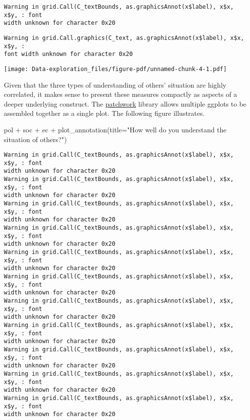 \documentclass[
  letterpaper,
  DIV=11,
  numbers=noendperiod]{scrreprt}
\newenvironment{Shaded}{\begin{snugshade}}{\end{snugshade}}
\newcommand{\AttributeTok}[1]{\textcolor[rgb]{0.40,0.45,0.13}{#1}}
\newcommand{\FunctionTok}[1]{\textcolor[rgb]{0.28,0.35,0.67}{#1}}
\newcommand{\NormalTok}[1]{\textcolor[rgb]{0.00,0.23,0.31}{#1}}
\newcommand{\SpecialCharTok}[1]{\textcolor[rgb]{0.37,0.37,0.37}{#1}}
\newcommand{\StringTok}[1]{\textcolor[rgb]{0.13,0.47,0.30}{#1}}
\begin{document}
\begin{verbatim}
Warning in grid.Call(C_textBounds, as.graphicsAnnot(x$label), x$x, x$y, : font
width unknown for character 0x20
\end{verbatim}

\begin{verbatim}
Warning in grid.Call.graphics(C_text, as.graphicsAnnot(x$label), x$x, x$y, :
font width unknown for character 0x20
\end{verbatim}

\texttt{[image: Data-exploration\_files/figure-pdf/unnamed-chunk-4-1.pdf]}

Given that the three types of understanding of others' situation are
highly correlated, it makes sense to present these measures compactly as
aspects of a deeper underlying construct. The
\href{https://patchwork.data-imaginist.com/}{patchwork} library allows
multiple ggplots to be assembled together as a single plot. The
following figure illustrates.

\begin{Shaded}
\begin{Highlighting}[]
\NormalTok{pol }\SpecialCharTok{+}\NormalTok{ soc }\SpecialCharTok{+}\NormalTok{ ec }\SpecialCharTok{+} 
  \FunctionTok{plot\_annotation}\NormalTok{(}\AttributeTok{title=}\StringTok{"How well do you understand the situation of others?"}\NormalTok{)}
\end{Highlighting}
\end{Shaded}

\begin{verbatim}
Warning in grid.Call(C_textBounds, as.graphicsAnnot(x$label), x$x, x$y, : font
width unknown for character 0x20
Warning in grid.Call(C_textBounds, as.graphicsAnnot(x$label), x$x, x$y, : font
width unknown for character 0x20
Warning in grid.Call(C_textBounds, as.graphicsAnnot(x$label), x$x, x$y, : font
width unknown for character 0x20
Warning in grid.Call(C_textBounds, as.graphicsAnnot(x$label), x$x, x$y, : font
width unknown for character 0x20
Warning in grid.Call(C_textBounds, as.graphicsAnnot(x$label), x$x, x$y, : font
width unknown for character 0x20
Warning in grid.Call(C_textBounds, as.graphicsAnnot(x$label), x$x, x$y, : font
width unknown for character 0x20
Warning in grid.Call(C_textBounds, as.graphicsAnnot(x$label), x$x, x$y, : font
width unknown for character 0x20
Warning in grid.Call(C_textBounds, as.graphicsAnnot(x$label), x$x, x$y, : font
width unknown for character 0x20
Warning in grid.Call(C_textBounds, as.graphicsAnnot(x$label), x$x, x$y, : font
width unknown for character 0x20
Warning in grid.Call(C_textBounds, as.graphicsAnnot(x$label), x$x, x$y, : font
width unknown for character 0x20
Warning in grid.Call(C_textBounds, as.graphicsAnnot(x$label), x$x, x$y, : font
width unknown for character 0x20
\end{verbatim}
\end{document}
